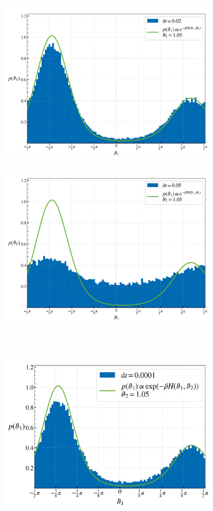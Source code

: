 \begin{figure}[htp]
		\begin{subfigure}{0.5\textwidth}
			\centering
			\includegraphics[width=0.8\linewidth]{graphics/eq-dist-0.02.png}
		\end{subfigure}
		\begin{subfigure}{0.5\textwidth}
			\centering
			\includegraphics[width=0.8\linewidth]{graphics/eq-dist-0.05.png}
		\end{subfigure} \\
		\begin{subfigure}{0.5\textwidth}
			\centering
			\includegraphics[width=0.8\linewidth]{graphics/eq-dist-0.0001.png}

\end{subfigure}
\end{figure}
